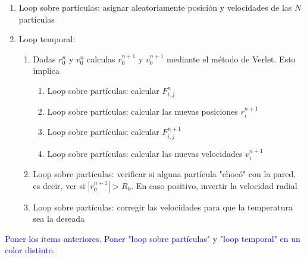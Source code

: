 \documentclass[aps,prb,twocolumn,superscriptaddress,floatfix,longbibliography]{revtex4-2}
\newcounter{para}
\begin{document}
\begin{enumerate}
    \item Loop sobre partículas: asignar aleatoriamente posición y velocidades de las $N$ partículas
    \item Loop temporal:
    \begin{enumerate}
        \item Dadas $r_0^n$ y $v_0^n$ calculas $r_0^{n+1}$ y $v_0^{n+1}$ mediante el método de Verlet. Esto implica
        \begin{enumerate}
            \item Loop sobre partículas: calcular $F_{i,j}^n$
            \item Loop sobre partículas: calcular las nuevas posiciones $r_{i}^{n+1}$
            \item Loop sobre partículas: calcular $F_{i,j}^{n+1}$
            \item Loop sobre partículas: calcular las nuevas velocidades $v_{i}^{n+1}$
        \end{enumerate}
        \item Loop sobre partículas: verificar si alguna partícula "chocó" con la pared, es decir, ver si $|r_0^{n+1}| > R_0$. En caso positivo, invertir la velocidad radial
        \item Loop sobre partículas: corregir las velocidades para que la temperatura sea la deseada
    \end{enumerate}
\end{enumerate}
\textcolor{blue}{Poner los items anteriores. Poner "loop sobre partículas" y "loop temporal" en un color distinto.}
\end{document}
